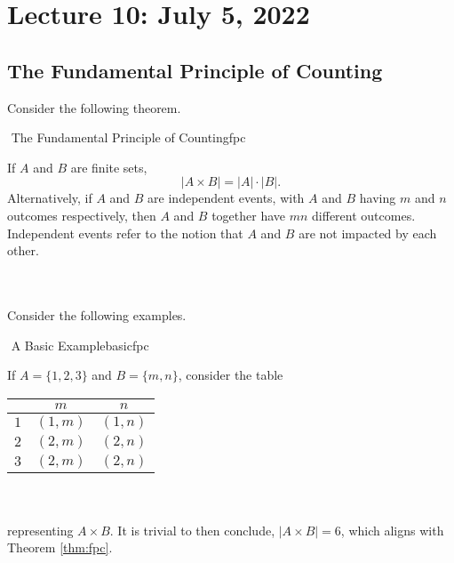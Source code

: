 \section{Lecture 10: July 5, 2022}

    \subsection{The Fundamental Principle of Counting}

        Consider the following theorem.

        \begin{theorem}{\Stop\,\,The Fundamental Principle of Counting}{fpc}

            If \(A\) and \(B\) are finite sets, 
            \begin{equation*}
                |A\times B|=|A|\cdot|B|.
            \end{equation*}
            Alternatively, if \(A\) and \(B\) are independent events, with \(A\) and \(B\) having \(m\) and \(n\) outcomes respectively, then \(A\) and \(B\) together have \(mn\) different outcomes. Independent events refer to the notion that \(A\) and \(B\) are not impacted by each other.

        \end{theorem}
        \vphantom
        \\
        \\
        Consider the following examples.
        \begin{example}{\Difficulty\,\,A Basic Example}{basicfpc}

            If \(A=\{1,2,3\}\) and \(B=\{m,n\}\), consider the table
            \begin{center}
                \begin{tabular}{c|cc}
                    \hline
                    & \(m\) & \(n\) \\
                    \hline
                    \(1\) & \((1,m)\) & \((1,n)\) \\
                    \(2\) & \((2,m)\) & \((2,n)\) \\
                    \(3\) & \((2,m)\) & \((2,n)\) \\
                    \hline
                \end{tabular}
            \end{center}
            \vphantom
            \\
            \\
            representing \(A\times B\). It is trivial to then conclude, \(|A\times B|=6\), which aligns with Theorem \ref{thm:fpc}.

        \end{example}

